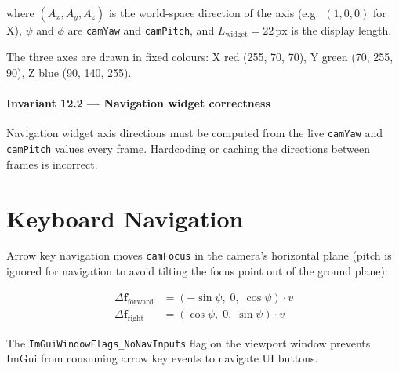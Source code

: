 where $(A_x, A_y, A_z)$ is the world-space direction of the axis (e.g.\
$(1, 0, 0)$ for X), $\psi$ and $\phi$ are \texttt{camYaw} and
\texttt{camPitch}, and $L_\text{widget} = 22\,\text{px}$ is the display
length.

The three axes are drawn in fixed colours: X red (255, 70, 70),
Y green (70, 255, 90), Z blue (90, 140, 255).


\paragraph{Invariant 12.2 --- Navigation widget correctness}

  Navigation widget axis directions must be computed from the live
  \texttt{camYaw} and \texttt{camPitch} values every frame.
  Hardcoding or caching the directions between frames is incorrect.



\section{Keyboard Navigation}

Arrow key navigation moves \texttt{camFocus} in the camera's horizontal
plane (pitch is ignored for navigation to avoid tilting the focus point
out of the ground plane):

\begin{align}
  \Delta\mathbf{f}_\text{forward}  &= (-\sin\psi,\; 0,\;  \cos\psi) \cdot v \\
  \Delta\mathbf{f}_\text{right}    &= ( \cos\psi,\; 0,\;  \sin\psi) \cdot v
\end{align}

The \texttt{ImGuiWindowFlags\_NoNavInputs} flag on the viewport window
prevents ImGui from consuming arrow key events to navigate UI buttons.
